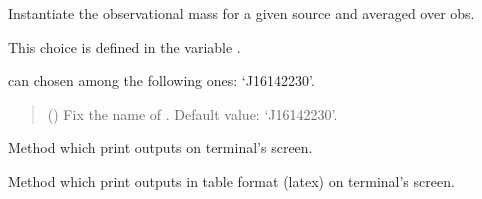 \documentclass[letterpaper,10pt,english]{sphinxmanual}
\begin{document}
\begin{fulllineitems}
\label{\detokenize{source/api/setup_astro_mr:nucleardatapy.astro.setup_mr.setupMRAverage}}
\pysigstartsignatures
{}
\pysigstopsignatures
\sphinxAtStartPar
Instantiate the observational mass for a given source and averaged over obs.

\sphinxAtStartPar
This choice is defined in the variable .

\sphinxAtStartPar
{} can chosen among the following ones: ‘J1614\textendash{}2230’.
\begin{quote}\begin{description}
\sphinxAtStartPar
{} (\sphinxstyleliteralemphasis{\sphinxupquote{, }}) \textendash{} Fix the name of . Default value: ‘J1614\textendash{}2230’.

\end{description}\end{quote}

\sphinxAtStartPar
{}

\begin{fulllineitems}
\label{\detokenize{source/api/setup_astro_mr:nucleardatapy.astro.setup_mr.setupMRAverage.print_output}}
\pysigstartsignatures
{}
\pysigstopsignatures
\sphinxAtStartPar
Method which print outputs on terminal’s screen.

\end{fulllineitems}


\begin{fulllineitems}
\label{\detokenize{source/api/setup_astro_mr:nucleardatapy.astro.setup_mr.setupMRAverage.print_table}}
\pysigstartsignatures
{}
\pysigstopsignatures
\sphinxAtStartPar
Method which print outputs in table format (latex) on terminal’s screen.

\end{fulllineitems}


\end{fulllineitems}
\end{document}
